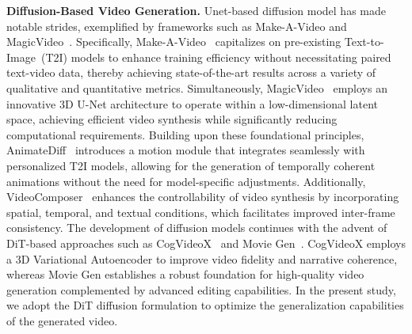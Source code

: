 \noindent\textbf{Diffusion-Based Video Generation.}
Unet-based diffusion model has made notable strides, exemplified by frameworks such as Make-A-Video and MagicVideo~\cite{zhou2022magicvideo}. 
Specifically, Make-A-Video~\cite{singer2022make} capitalizes on pre-existing Text-to-Image~(T2I) models to enhance training efficiency without necessitating paired text-video data, thereby achieving state-of-the-art results across a variety of qualitative and quantitative metrics. 
Simultaneously, MagicVideo~\cite{zhou2022magicvideo} employs an innovative 3D U-Net architecture to operate within a low-dimensional latent space, achieving efficient video synthesis while significantly reducing computational requirements. 
Building upon these foundational principles, AnimateDiff~\cite{guo2023animatediff} introduces a motion module that integrates seamlessly with personalized T2I models, allowing for the generation of temporally coherent animations without the need for model-specific adjustments. 
Additionally, VideoComposer~\cite{wang2023videocomposer} enhances the controllability of video synthesis by incorporating spatial, temporal, and textual conditions, which facilitates improved inter-frame consistency. 
The development of diffusion models continues with the advent of DiT-based approaches such as CogVideoX~\cite{yang2024cogvideox} and Movie Gen~\cite{polyak2024movie}. 
CogVideoX employs a 3D Variational Autoencoder to improve video fidelity and narrative coherence, whereas Movie Gen establishes a robust foundation for high-quality video generation complemented by advanced editing capabilities. 
In the present study, we adopt the DiT diffusion formulation to optimize the generalization capabilities of the generated video.
